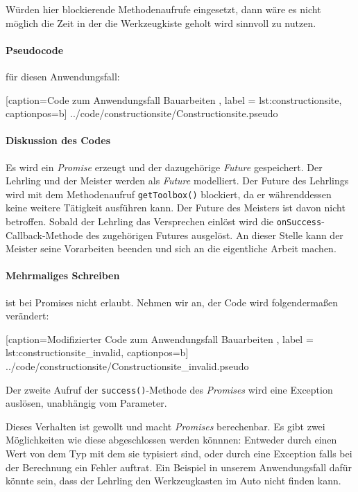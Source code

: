 Würden hier blockierende Methodenaufrufe eingesetzt, dann wäre es nicht
möglich die Zeit in der die Werkzeugkiste geholt wird sinnvoll zu
nutzen.

\paragraph{Pseudocode} für diesen Anwendungsfall:


    [caption={Code zum Anwendungsfall \glqq Bauarbeiten\grqq{} },
       label = lst:constructionsite,
       captionpos=b]
 {../code/constructionsite/Constructionsite.pseudo}

\paragraph{Diskussion des Codes}

Es wird ein \emph{Promise} erzeugt und der dazugehörige \emph{Future}
gespeichert. Der Lehrling und der Meister werden als \emph{Future}
modelliert. Der Future des Lehrlings wird mit dem Methodenaufruf
\texttt{getToolbox()} blockiert, da er währenddessen keine weitere
Tätigkeit ausführen kann. Der Future des Meisters ist davon nicht
betroffen. Sobald der Lehrling das Versprechen einlöst wird die
\texttt{onSuccess}-Callback-Methode des zugehörigen Futures ausgelöst.
An dieser Stelle kann der Meister seine Vorarbeiten beenden und sich
an die eigentliche Arbeit machen.

\paragraph{Mehrmaliges Schreiben} ist bei Promises nicht erlaubt.
Nehmen wir an, der Code wird folgendermaßen verändert:


    [caption={Modifizierter Code zum Anwendungsfall \glqq Bauarbeiten\grqq{} },
       label = lst:constructionsite_invalid,
       captionpos=b]
 {../code/constructionsite/Constructionsite_invalid.pseudo}
 
Der zweite Aufruf der \texttt{success()}-Methode des \emph{Promises}
wird eine Exception auslösen, unabhängig vom Parameter.

Dieses Verhalten ist gewollt und macht \emph{Promises} berechenbar.
Es gibt zwei Möglichkeiten wie diese abgeschlossen werden könnnen:
Entweder durch einen Wert von dem Typ mit dem sie typisiert sind,
oder durch eine Exception falls bei der Berechnung ein Fehler auftrat.
Ein Beispiel in unserem Anwendungsfall dafür könnte sein, dass der
Lehrling den Werkzeugkasten im Auto nicht finden kann.
